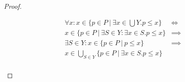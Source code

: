 \begin{proof}
\begin{enumerate}
\begin{itemize}
	$$
	\begin{array}{lll}
	\forall x : x \in \{p \in P\ |\ \exists x \in \bigcup Y. p \leq x\} & \iff & \\
	x \in \{p \in P\ |\ \exists S \in Y: \exists x \in S. p \leq x \} & \implies & \\
	\exists S \in Y : x \in \{p \in P\ |\ p \leq x \} & \implies & \\
	x \in \bigcup_{S \in Y} \{p \in P\ |\ \exists x \in S. p \leq x\} & & \\
	
	\end{array}
	$$
\end{itemize}

\end{enumerate}

\end{proof}

\let\powerset\undefined
